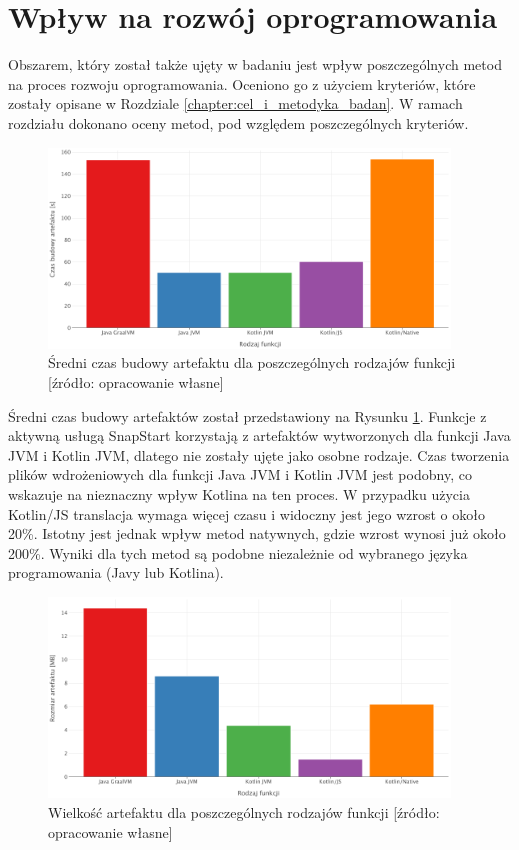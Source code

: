 \section{Wpływ na rozwój oprogramowania}\label{chapter:development-process}

Obszarem, który został także ujęty w badaniu jest wpływ poszczególnych metod na proces rozwoju oprogramowania.
Oceniono go z użyciem kryteriów, które zostały opisane w Rozdziale \ref{chapter:cel_i_metodyka_badan}.
W ramach rozdziału dokonano oceny metod, pod względem poszczególnych kryteriów.

\begin{figure}[h]
    \centering
    \includegraphics[width=0.95\textwidth]{charts/results/avg-build-times.png}
    \caption{Średni czas budowy artefaktu dla poszczególnych rodzajów funkcji [źródło: opracowanie własne]}
    \label{fig:avg_build_times}
\end{figure}

Średni czas budowy artefaktów został przedstawiony na Rysunku \ref{fig:avg_build_times}.
Funkcje z aktywną usługą SnapStart korzystają z artefaktów wytworzonych dla funkcji Java JVM i Kotlin JVM, dlatego nie zostały ujęte jako osobne rodzaje.
Czas tworzenia plików wdrożeniowych dla funkcji Java JVM i Kotlin JVM jest podobny, co wskazuje na nieznaczny wpływ Kotlina na ten proces.
W przypadku użycia Kotlin/JS translacja wymaga więcej czasu i widoczny jest jego wzrost o około 20\%.
Istotny jest jednak wpływ metod natywnych, gdzie wzrost wynosi już około 200\%.
Wyniki dla tych metod są podobne niezależnie od wybranego języka programowania (Javy lub Kotlina).

\begin{figure}[h]
    \centering
    \includegraphics[width=0.95\textwidth]{charts/results/artifact-size.png}
    \caption{Wielkość artefaktu dla poszczególnych rodzajów funkcji [źródło: opracowanie własne]}
    \label{fig:artifact_size}
\end{figure}

